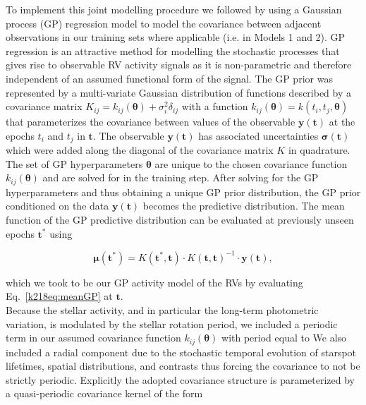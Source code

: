 To implement this joint modelling procedure
we followed \cite{cloutier17a} by using a Gaussian process (GP) regression model to model the covariance between
adjacent observations in our training sets where applicable (i.e. in Models 1 and 2).
GP regression is an attractive method for modelling the
stochastic processes that gives rise to observable RV activity signals as it is non-parametric and therefore
independent of an assumed functional form of the signal. The GP prior was represented by a multi-variate
Gaussian distribution of functions described by a covariance matrix
$K_{ij}=k_{ij}(\boldsymbol{\theta}) + \sigma^2_i\delta_{ij}$
with a function $k_{ij}(\boldsymbol{\theta})=k(t_i,t_j,\boldsymbol{\theta})$ that parameterizes the
covariance between values of the observable $\mathbf{y}(\mathbf{t})$ at the epochs $t_i$ and $t_j$ in
$\mathbf{t}$. The observable $\mathbf{y}(\mathbf{t})$ has associated uncertainties
$\boldsymbol{\sigma}(\mathbf{t})$
which were added along the diagonal of the covariance matrix $K$ in quadrature. 
The set of GP hyperparameters $\boldsymbol{\theta}$ are unique to the chosen covariance function
$k_{ij}(\boldsymbol{\theta})$ and are solved for in the training step. After solving for the
GP hyperparameters and thus obtaining a unique GP prior distribution, the GP prior conditioned on the data
$\mathbf{y}(\mathbf{t})$ becomes the predictive distribution. The mean function of the GP predictive distribution
can be evaluated at previously unseen epochs $\mathbf{t^*}$ using 

\begin{equation}
  \boldsymbol{\mu}(\mathbf{t^*}) = K(\mathbf{t^*},\mathbf{t}) \cdot K(\mathbf{t},\mathbf{t})^{-1} \cdot
  \mathbf{y}(\mathbf{t}), \label{k218eq:meanGP}
\end{equation}

\noindent which we took to be our GP activity model of the RVs 
by evaluating Eq.~\ref{k218eq:meanGP} at $\mathbf{t}$. \\

Because the stellar activity, and in particular the long-term photometric variation,
is modulated by the stellar rotation period, we included a
periodic term in our assumed covariance function $k_{ij}(\boldsymbol{\theta})$
with period equal to  We also included a radial component 
due to the stochastic temporal evolution of starspot lifetimes, spatial distributions,
and contrasts thus forcing the covariance to not be strictly periodic.
Explicitly the adopted covariance structure is
parameterized by a quasi-periodic covariance kernel of the form


